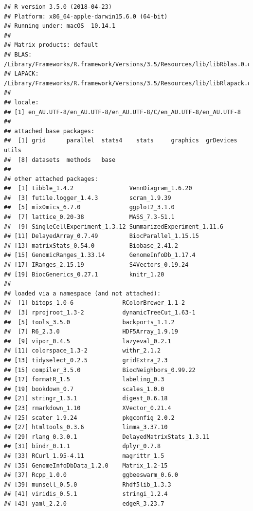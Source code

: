 \documentclass[]{book}
\theoremstyle{definition}
\theoremstyle{definition}
\theoremstyle{definition}
\theoremstyle{remark}
\begin{document}
\begin{verbatim}
## R version 3.5.0 (2018-04-23)
## Platform: x86_64-apple-darwin15.6.0 (64-bit)
## Running under: macOS  10.14.1
## 
## Matrix products: default
## BLAS: /Library/Frameworks/R.framework/Versions/3.5/Resources/lib/libRblas.0.dylib
## LAPACK: /Library/Frameworks/R.framework/Versions/3.5/Resources/lib/libRlapack.dylib
## 
## locale:
## [1] en_AU.UTF-8/en_AU.UTF-8/en_AU.UTF-8/C/en_AU.UTF-8/en_AU.UTF-8
## 
## attached base packages:
##  [1] grid      parallel  stats4    stats     graphics  grDevices utils    
##  [8] datasets  methods   base     
## 
## other attached packages:
##  [1] tibble_1.4.2                VennDiagram_1.6.20         
##  [3] futile.logger_1.4.3         scran_1.9.39               
##  [5] mixOmics_6.7.0              ggplot2_3.1.0              
##  [7] lattice_0.20-38             MASS_7.3-51.1              
##  [9] SingleCellExperiment_1.3.12 SummarizedExperiment_1.11.6
## [11] DelayedArray_0.7.49         BiocParallel_1.15.15       
## [13] matrixStats_0.54.0          Biobase_2.41.2             
## [15] GenomicRanges_1.33.14       GenomeInfoDb_1.17.4        
## [17] IRanges_2.15.19             S4Vectors_0.19.24          
## [19] BiocGenerics_0.27.1         knitr_1.20                 
## 
## loaded via a namespace (and not attached):
##  [1] bitops_1.0-6              RColorBrewer_1.1-2       
##  [3] rprojroot_1.3-2           dynamicTreeCut_1.63-1    
##  [5] tools_3.5.0               backports_1.1.2          
##  [7] R6_2.3.0                  HDF5Array_1.9.19         
##  [9] vipor_0.4.5               lazyeval_0.2.1           
## [11] colorspace_1.3-2          withr_2.1.2              
## [13] tidyselect_0.2.5          gridExtra_2.3            
## [15] compiler_3.5.0            BiocNeighbors_0.99.22    
## [17] formatR_1.5               labeling_0.3             
## [19] bookdown_0.7              scales_1.0.0             
## [21] stringr_1.3.1             digest_0.6.18            
## [23] rmarkdown_1.10            XVector_0.21.4           
## [25] scater_1.9.24             pkgconfig_2.0.2          
## [27] htmltools_0.3.6           limma_3.37.10            
## [29] rlang_0.3.0.1             DelayedMatrixStats_1.3.11
## [31] bindr_0.1.1               dplyr_0.7.8              
## [33] RCurl_1.95-4.11           magrittr_1.5             
## [35] GenomeInfoDbData_1.2.0    Matrix_1.2-15            
## [37] Rcpp_1.0.0                ggbeeswarm_0.6.0         
## [39] munsell_0.5.0             Rhdf5lib_1.3.3           
## [41] viridis_0.5.1             stringi_1.2.4            
## [43] yaml_2.2.0                edgeR_3.23.7             

\end{verbatim}
\end{document}
